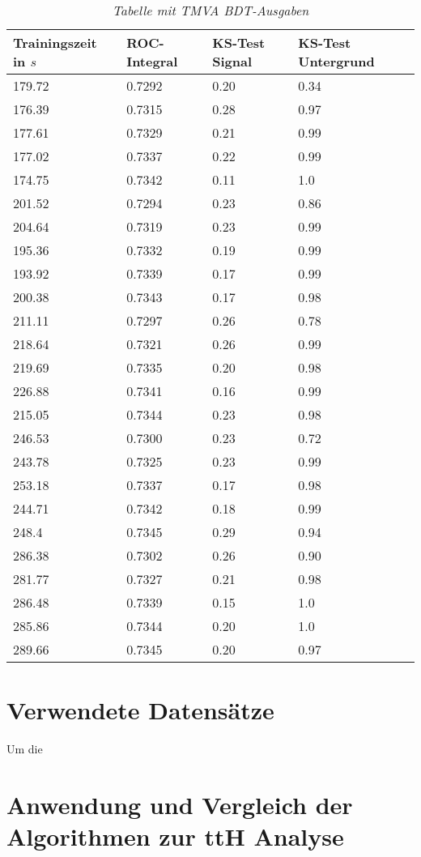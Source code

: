 \begin{table}[hhh]\parbox{12cm}{
  \caption[TMVA 6j4t Ergebnisse]{\it Tabelle mit TMVA BDT-Ausgaben}%
  }\label{tab:tmva}
  \begin{center}
  \begin{tabular}{llll}
  \hline
  Trainingszeit in $s$ & ROC-Integral & KS-Test Signal & KS-Test Untergrund\\
  \hline
  \hline
179.72 & 0.7292 & 0.20 & 0.34\\ 
176.39 & 0.7315 & 0.28 & 0.97\\ 
177.61 & 0.7329 & 0.21 & 0.99\\ 
177.02 & 0.7337 & 0.22 & 0.99\\ 
174.75 & 0.7342 & 0.11 & 1.0\\ 
201.52 & 0.7294 & 0.23 & 0.86\\ 
204.64 & 0.7319 & 0.23 & 0.99\\ 
195.36 & 0.7332 & 0.19 & 0.99\\ 
193.92 & 0.7339 & 0.17 & 0.99\\ 
200.38 & 0.7343 & 0.17 & 0.98\\ 
211.11 & 0.7297 & 0.26 & 0.78\\ 
218.64 & 0.7321 & 0.26 & 0.99\\ 
219.69 & 0.7335 & 0.20 & 0.98\\ 
226.88 & 0.7341 & 0.16 & 0.99\\ 
215.05 & 0.7344 & 0.23 & 0.98\\ 
246.53 & 0.7300 & 0.23 & 0.72\\ 
243.78 & 0.7325 & 0.23 & 0.99\\
253.18 & 0.7337 & 0.17 & 0.98\\ 
244.71 & 0.7342 & 0.18 & 0.99\\ 
248.4  & 0.7345 & 0.29 & 0.94\\ 
286.38 & 0.7302 & 0.26 & 0.90\\ 
281.77 & 0.7327 & 0.21 & 0.98\\ 
286.48 & 0.7339 & 0.15 & 1.0\\ 
285.86 & 0.7344 & 0.20 & 1.0\\ 
289.66 & 0.7345 & 0.20 & 0.97\\ 
  \hline
  \end{tabular}
  \end{center}
\end{table}

\section{Verwendete Datens\"atze}
\label{ch:Vergleich:sec:Daten}

Um die 

\section{Anwendung und Vergleich der Algorithmen zur ttH Analyse}
\label{ch:Vergleich:sec:ttH}
